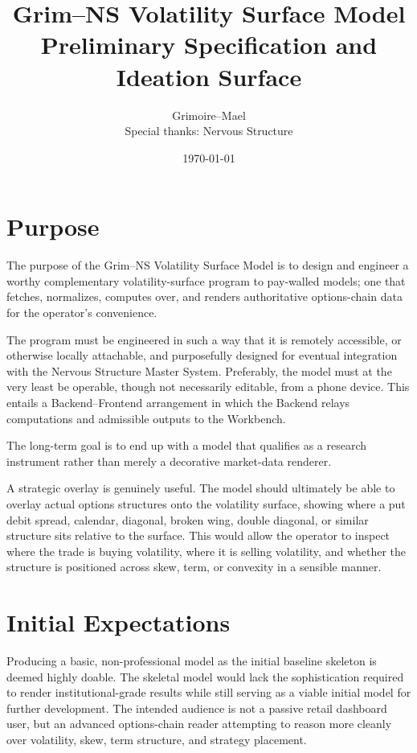\documentclass[11pt]{article}
\title{\textbf{Grim--NS Volatility Surface Model}\\
\large Preliminary Specification and Ideation Surface}
\author{Grimoire--Mael\\
Special thanks: Nervous Structure}
\date{\today}
\begin{document}
\maketitle

\section{Purpose}

The purpose of the Grim--NS Volatility Surface Model is to design and engineer a worthy complementary volatility-surface program to pay-walled models; one that fetches, normalizes, computes over, and renders authoritative options-chain data for the operator's convenience.

The program must be engineered in such a way that it is remotely accessible, or otherwise locally attachable, and purposefully designed for eventual integration with the Nervous Structure Master System. Preferably, the model must at the very least be operable, though not necessarily editable, from a phone device. This entails a Backend--Frontend arrangement in which the Backend relays computations and admissible outputs to the Workbench.

The long-term goal is to end up with a model that qualifies as a research instrument rather than merely a decorative market-data renderer.

A strategic overlay is genuinely useful. The model should ultimately be able to overlay actual options structures onto the volatility surface, showing where a put debit spread, calendar, diagonal, broken wing, double diagonal, or similar structure sits relative to the surface. This would allow the operator to inspect where the trade is buying volatility, where it is selling volatility, and whether the structure is positioned across skew, term, or convexity in a sensible manner.

\section{Initial Expectations}

Producing a basic, non-professional model as the initial baseline skeleton is deemed highly doable. The skeletal model would lack the sophistication required to render institutional-grade results while still serving as a viable initial model for further development. The intended audience is not a passive retail dashboard user, but an advanced options-chain reader attempting to reason more cleanly over volatility, skew, term structure, and strategy placement.
\end{document}
